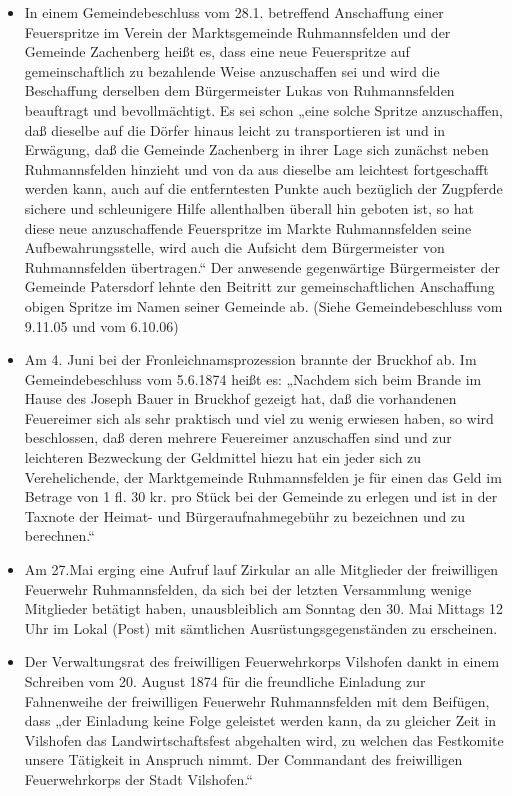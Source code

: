 \documentclass[12pt,a4paper]{book}
\begin{document}
\begin{itemize}
\item In einem Gemeindebeschluss vom 28.1. betreffend Anschaffung einer
Feuerspritze im Verein der Marktsgemeinde Ruhmannsfelden und der Gemeinde
Zachenberg heißt es, dass eine neue Feuerspritze auf gemeinschaftlich zu
bezahlende Weise anzuschaffen sei und wird die Beschaffung derselben dem
Bürgermeister Lukas von Ruhmannsfelden beauftragt und bevollmächtigt. Es sei
schon „eine solche Spritze anzuschaffen, daß dieselbe auf die Dörfer hinaus
leicht zu transportieren ist und in Erwägung, daß die Gemeinde Zachenberg in
ihrer Lage sich zunächst neben Ruhmannsfelden hinzieht und von da aus dieselbe
am leichtest fortgeschafft werden kann, auch auf die entferntesten Punkte auch
bezüglich der Zugpferde sichere und schleunigere Hilfe allenthalben überall hin
geboten ist, so hat diese neue anzuschaffende Feuerspritze im Markte
Ruhmannsfelden seine Aufbewahrungsstelle, wird auch die Aufsicht dem
Bürgermeister von Ruhmannsfelden übertragen.“ Der anwesende gegenwärtige
Bürgermeister der Gemeinde Patersdorf lehnte den Beitritt zur gemeinschaftlichen
Anschaffung obigen Spritze im Namen seiner Gemeinde ab. (Siehe Gemeindebeschluss
vom 9.11.05 und vom 6.10.06)

\item Am 4. Juni bei der Fronleichnamsprozession brannte der Bruckhof ab. Im
Gemeindebeschluss vom 5.6.1874 heißt es: „Nachdem sich beim Brande im Hause des
Joseph Bauer in Bruckhof gezeigt hat, daß die vorhandenen Feuereimer sich als
sehr praktisch und viel zu wenig erwiesen haben, so wird beschlossen, daß deren
mehrere Feuereimer anzuschaffen sind und zur leichteren Bezweckung der
Geldmittel hiezu hat ein jeder sich zu Verehelichende, der Marktgemeinde
Ruhmannsfelden je für einen das Geld im Betrage von 1 fl. 30 kr. pro Stück bei
der Gemeinde zu erlegen und ist in der Taxnote der Heimat- und
Bürgeraufnahmegebühr zu bezeichnen und zu berechnen.“

\item Am 27.Mai erging eine Aufruf lauf Zirkular an alle Mitglieder der
freiwilligen Feuerwehr Ruhmannsfelden, da sich bei der letzten Versammlung
wenige Mitglieder betätigt haben, unausbleiblich am Sonntag den 30. Mai Mittags
12 Uhr im Lokal (Post) mit sämtlichen Ausrüstungsgegenständen zu erscheinen.

\item Der Verwaltungsrat des freiwilligen Feuerwehrkorps Vilshofen dankt in
einem Schreiben vom 20. August 1874 für die freundliche Einladung zur
Fahnenweihe der freiwilligen Feuerwehr Ruhmannsfelden mit dem Beifügen, dass
„der Einladung keine Folge geleistet werden kann, da zu gleicher Zeit in
Vilshofen das Landwirtschaftsfest abgehalten wird, zu welchen das Festkomite
unsere Tätigkeit in Anspruch nimmt. Der Commandant des freiwilligen
Feuerwehrkorps der Stadt Vilshofen.“


\end{itemize}
\end{document}

